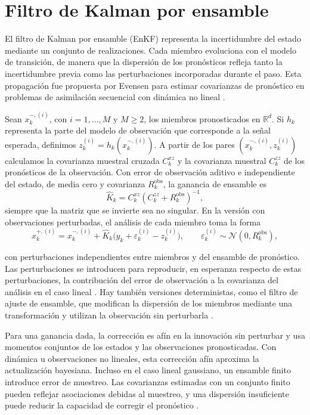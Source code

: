 \section{Filtro de Kalman por ensamble}
\label{sec:enkf}

El filtro de Kalman por ensamble (EnKF) representa la incertidumbre del estado mediante un conjunto de realizaciones. Cada miembro evoluciona con el modelo de transición, de manera que la dispersión de los pronósticos refleja tanto la incertidumbre previa como las perturbaciones incorporadas durante el paso. Esta propagación fue propuesta por Evensen para estimar covarianzas de pronóstico en problemas de asimilación secuencial con dinámica no lineal \cite{evensen1994}\label{cita:evensen1994}.



Sean $x_k^{-,(i)}$, con $i=1,\ldots,M$ y $M\geq 2$, los miembros pronosticados en $\mathbb R^d$. Si $h_k$ representa la parte del modelo de observación que corresponde a la señal esperada, definimos $z_k^{(i)}=h_k(x_k^{-,(i)})$. A partir de los pares $(x_k^{-,(i)},z_k^{(i)})$ calculamos la covarianza muestral cruzada $C_k^{xz}$ y la covarianza muestral $C_k^{zz}$ de los pronósticos de la observación. Con error de observación aditivo e independiente del estado, de media cero y covarianza $R_k^{\mathrm{obs}}$, la ganancia de ensamble es
\begin{equation}
    \widehat K_k=C_k^{xz}(C_k^{zz}+R_k^{\mathrm{obs}})^{-1},
\end{equation}
siempre que la matriz que se invierte sea no singular. En la versión con observaciones perturbadas, el análisis de cada miembro toma la forma
\begin{equation}
    x_k^{+,(i)}=x_k^{-,(i)}
         +\widehat K_k\bigl(y_k+\varepsilon_k^{(i)}-z_k^{(i)}\bigr),
    \qquad \varepsilon_k^{(i)}\sim\mathcal N(0,R_k^{\mathrm{obs}}),
\end{equation}

con perturbaciones independientes entre miembros y del ensamble de pronóstico. Las perturbaciones se introducen para reproducir, en esperanza respecto de estas perturbaciones, la contribución del error de observación a la covarianza del análisis en el caso lineal \cite{burgers1998}\label{cita:burgers1998}. Hay también versiones deterministas, como el filtro de ajuste de ensamble, que modifican la dispersión de los miembros mediante una transformación y utilizan la observación sin perturbarla \cite{anderson2001}\label{cita:anderson2001}.

Para una ganancia dada, la corrección es afín en la innovación sin perturbar y usa momentos conjuntos de los estados y las observaciones pronosticadas. Con dinámica u observaciones no lineales, esta corrección afín aproxima la actualización bayesiana. Incluso en el caso lineal gaussiano, un ensamble finito introduce error de muestreo. Las covarianzas estimadas con un conjunto finito pueden reflejar asociaciones debidas al muestreo, y una dispersión insuficiente puede reducir la capacidad de corregir el pronóstico \cite{evensen2009}\label{cita:evensen2009}.

